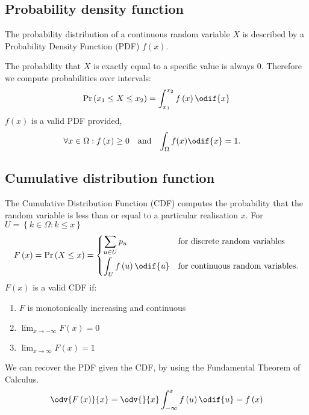 \documentclass{article}
\begin{document}
\begin{multicols}{3}
    \subsection{Probability density function}
    The probability distribution of a continuous random variable \(X\) is described by a Probability
    Density Function (PDF) \(f\left( x \right)\).

    The probability that \(X\) is exactly equal to a
    specific value is always 0. Therefore we compute probabilities over intervals:
    \begin{equation*}
        \Pr{\left( x_1 \leq X \leq x_2 \right)} = \int_{x_1}^{x_2} f\left( x \right) \odif{x}
    \end{equation*}
    \(f\left( x \right)\) is a valid PDF provided,
    \begin{align*}
        \forall x \in \Omega : f\left( x \right) & \geq 0 &  & \text{and} & \int_{\Omega} f(x) \odif{x} & = 1.
    \end{align*}
    \subsection{Cumulative distribution function}
    The Cumulative Distribution Function (CDF) computes the probability that the random variable is
    less than or equal to a particular realisation \(x\). For \(U = \left\{ k \in \Omega : k \leq x \right\}\)
    \begin{equation*}
        F\left( x \right) = \Pr{\left( X \leq x \right)} = \begin{cases}
            \displaystyle \sum_{u \in U} p_u                  & \text{for discrete random variables}    \\[0.4cm]
            \displaystyle \int_{U} f\left( u \right) \odif{u} & \text{for continuous random variables}.
        \end{cases}
    \end{equation*}
    \(F\left( x \right)\) is a valid CDF if:
    \begin{enumerate}
        \item \(F\) is monotonically increasing and continuous
        \item \(\lim_{x \to -\infty} F\left( x \right) = 0\)
        \item \(\lim_{x \to \infty} F\left( x \right) = 1\)
    \end{enumerate}
    We can recover the PDF given the CDF, by using the Fundamental Theorem of Calculus.
    \begin{equation*}
        \odv{F\left( x \right)}{x} = \odv{}{x} \int_{-\infty}^x f\left( u \right) \odif{u} = f\left( x \right)
    \end{equation*}

\end{multicols}
\end{document}
